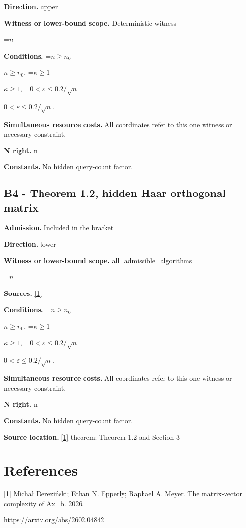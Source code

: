\documentclass[10pt,a4paper]{article}
\newcommand{\AtlasMath}[1]{\par\begingroup\centering\setbox0=\hbox{$\displaystyle #1$}\ifdim\wd0>1.4\linewidth\typeout{ATLAS WIDE FORMULA: \the\wd0}\fi\ifdim\wd0>\linewidth\resizebox{\linewidth}{!}{\box0}\else\box0\fi\par\endgroup}
\newcommand{\AtlasInlineMath}[1]{\begingroup\setbox0=\hbox{$#1$}\ifdim\wd0>.4\linewidth\endgroup\AtlasMath{#1}\else\endgroup$#1$\fi}
\begin{document}
\textbf{Direction.} upper

\textbf{Witness or lower-bound scope.} Deterministic witness

\AtlasMath{n}
\textbf{Conditions.} \AtlasInlineMath{n\ge n_0}, \AtlasInlineMath{\kappa\ge1}, \AtlasInlineMath{0<\varepsilon\le 0.2/\sqrt n}.

\textbf{Simultaneous resource costs.} All coordinates refer to this one witness or necessary constraint.

\textbf{N right.} n

\textbf{Constants.} No hidden query-count factor.

\subsection{B4 - Theorem 1.2, hidden Haar orthogonal matrix}
\textbf{Admission.} Included in the bracket

\textbf{Direction.} lower

\textbf{Witness or lower-bound scope.} all\_admissible\_algorithms

\AtlasMath{n}
\textbf{Sources.} \href{https://arxiv.org/abs/2602.04842}{[1]}

\textbf{Conditions.} \AtlasInlineMath{n\ge n_0}, \AtlasInlineMath{\kappa\ge1}, \AtlasInlineMath{0<\varepsilon\le 0.2/\sqrt n}.

\textbf{Simultaneous resource costs.} All coordinates refer to this one witness or necessary constraint.

\textbf{N right.} n

\textbf{Constants.} No hidden query-count factor.

\textbf{Source location.} \href{https://arxiv.org/abs/2602.04842}{[1]} theorem: Theorem 1.2 and Section 3

\section{References}
[1] Michał Dereziński; Ethan N. Epperly; Raphael A. Meyer. The matrix-vector complexity of Ax=b. 2026.

\url{https://arxiv.org/abs/2602.04842}
\end{document}
